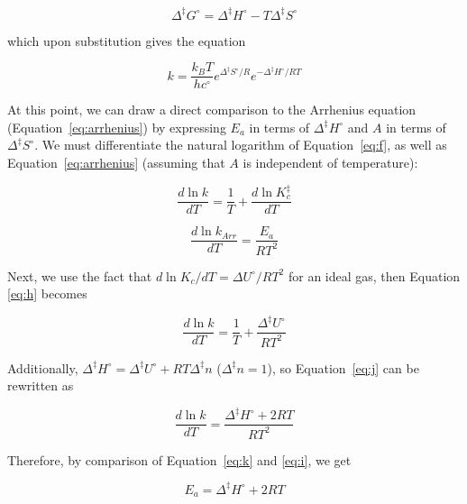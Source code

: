 \begin{doublespace}
\begin{equation}
  \Delta^\ddagger G^\circ = \Delta^\ddagger H^\circ - T \Delta^\ddagger S^\circ
\end{equation}

\noindent which upon substitution gives the equation

\begin{equation}
  k = \frac{k_B T}{hc^\circ} e^{\Delta^\ddagger S^\circ/R} e^{-\Delta^\ddagger H^\circ/RT}
\label{eq:M}
\end{equation}

At this point, we can draw a direct comparison to the Arrhenius equation
(Equation~\ref{eq:arrhenius}) by expressing $E_a$ in terms of $\Delta^\ddagger
H^\circ$ and $A$ in terms of $\Delta^\ddagger S^\circ$.  We must differentiate the
natural logarithm of Equation~\ref{eq:f}, as well as
Equation~\ref{eq:arrhenius} (assuming that $A$ is independent of temperature):

\begin{equation}
  \frac{d \ln k}{dT} = \frac{1}{T} + \frac{d \ln K_c^\ddagger}{dT}
  \label{eq:h}
\end{equation}

\begin{equation}
  \frac{d \ln k_{Arr}}{dT} = \frac{E_a}{RT^2}
  \label{eq:i}
\end{equation}

\noindent Next, we use the fact that $d \ln K_c / dT = \Delta U^\circ/RT^2$ for an
ideal gas, then Equation \ref{eq:h}  becomes

\begin{equation}
  \frac{d \ln k}{dT} = \frac{1}{T} + \frac{\Delta ^\ddagger U^\circ}{RT^2}
  \label{eq:j}
\end{equation}

\noindent Additionally, $\Delta ^\ddagger H^\circ = \Delta ^\ddagger U^\circ + RT
\Delta^\ddagger n$ ($\Delta^\ddagger n = 1$), so Equation~\ref{eq:j} can be
rewritten as

\begin{equation}
  \frac{d \ln k}{dT} = \frac{\Delta ^\ddagger H^\circ + 2RT}{RT^2}
  \label{eq:k}
\end{equation}

\noindent Therefore, by comparison of Equation~\ref{eq:k} and \ref{eq:i}, we
get

\begin{equation}
  E_a = \Delta^\ddagger H^\circ + 2RT
  \label{eq:Ea-vs-dH}
\end{equation}


\end{doublespace}
